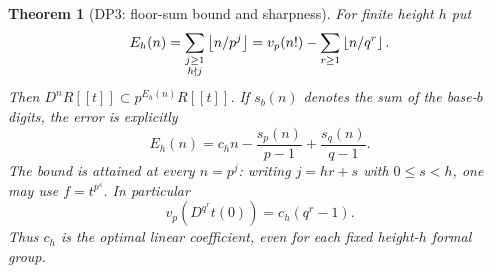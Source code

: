 \documentclass[11pt,a4paper]{article}
\newtheorem{theorem}{Theorem}[section]
\theoremstyle{definition}\newtheorem{remark}[theorem]{Remark}
\newcommand{\vp}{v_p}\newcommand{\dR}{\mathrm{dR}}\newcommand{\crys}{\mathrm{crys}}
\begin{document}
\begin{theorem}[DP3: floor-sum bound and sharpness]\label{DP3}
For finite height $h$ put
\begin{equation}\label{eq:Eh}
 E_h(n)=\sum_{\substack{j\ge1\\h\nmid j}}\floor{n/p^j}
 =\vp(n!)-\sum_{r\ge1}\floor{n/q^r}.
\end{equation}
Then $D^nR[[t]]\subset p^{E_h(n)}R[[t]]$. If $s_b(n)$ denotes the sum of the base-$b$ digits, the error is explicitly
\begin{equation}\label{eq:digiterror}
 E_h(n)=c_hn-\frac{s_p(n)}{p-1}+\frac{s_q(n)}{q-1}.
\end{equation}
The bound is attained at every $n=p^j$: writing $j=hr+s$ with $0\le s<h$, one may use $f=t^{p^s}$. In particular
\begin{equation}\label{eq:slopesharp}
 \vp(D^{q^r}t(0))=c_h(q^r-1).
\end{equation}
Thus $c_h$ is the optimal linear coefficient, even for each fixed height-$h$ formal group.
\end{theorem}
\end{document}
